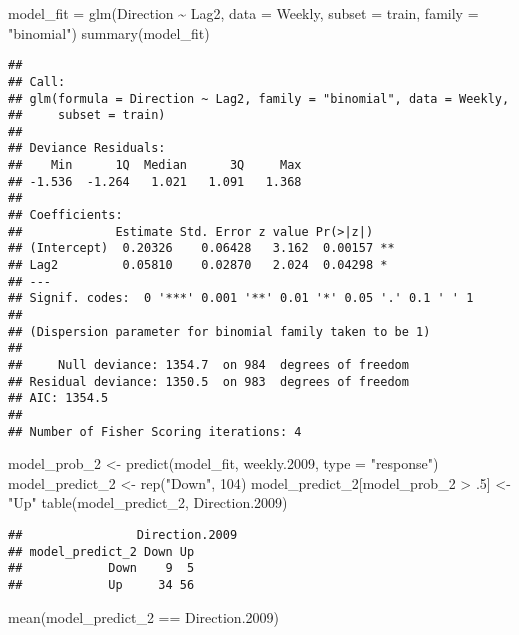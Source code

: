 \documentclass[
]{article}
\newenvironment{Shaded}{\begin{snugshade}}{\end{snugshade}}
\newcommand{\AttributeTok}[1]{\textcolor[rgb]{0.77,0.63,0.00}{#1}}
\newcommand{\DecValTok}[1]{\textcolor[rgb]{0.00,0.00,0.81}{#1}}
\newcommand{\FloatTok}[1]{\textcolor[rgb]{0.00,0.00,0.81}{#1}}
\newcommand{\FunctionTok}[1]{\textcolor[rgb]{0.00,0.00,0.00}{#1}}
\newcommand{\NormalTok}[1]{#1}
\newcommand{\OtherTok}[1]{\textcolor[rgb]{0.56,0.35,0.01}{#1}}
\newcommand{\SpecialCharTok}[1]{\textcolor[rgb]{0.00,0.00,0.00}{#1}}
\newcommand{\StringTok}[1]{\textcolor[rgb]{0.31,0.60,0.02}{#1}}
\begin{document}
\begin{Shaded}
\begin{Highlighting}[]
\NormalTok{model\_fit }\OtherTok{=} \FunctionTok{glm}\NormalTok{(Direction }\SpecialCharTok{\textasciitilde{}}\NormalTok{ Lag2, }\AttributeTok{data =}\NormalTok{ Weekly, }\AttributeTok{subset =}\NormalTok{ train, }\AttributeTok{family =} \StringTok{"binomial"}\NormalTok{)}
\FunctionTok{summary}\NormalTok{(model\_fit)}
\end{Highlighting}
\end{Shaded}

\begin{verbatim}
## 
## Call:
## glm(formula = Direction ~ Lag2, family = "binomial", data = Weekly, 
##     subset = train)
## 
## Deviance Residuals: 
##    Min      1Q  Median      3Q     Max  
## -1.536  -1.264   1.021   1.091   1.368  
## 
## Coefficients:
##             Estimate Std. Error z value Pr(>|z|)   
## (Intercept)  0.20326    0.06428   3.162  0.00157 **
## Lag2         0.05810    0.02870   2.024  0.04298 * 
## ---
## Signif. codes:  0 '***' 0.001 '**' 0.01 '*' 0.05 '.' 0.1 ' ' 1
## 
## (Dispersion parameter for binomial family taken to be 1)
## 
##     Null deviance: 1354.7  on 984  degrees of freedom
## Residual deviance: 1350.5  on 983  degrees of freedom
## AIC: 1354.5
## 
## Number of Fisher Scoring iterations: 4
\end{verbatim}

\begin{Shaded}
\begin{Highlighting}[]
\NormalTok{model\_prob\_2 }\OtherTok{\textless{}{-}} \FunctionTok{predict}\NormalTok{(model\_fit, weekly}\FloatTok{.2009}\NormalTok{, }\AttributeTok{type =} \StringTok{"response"}\NormalTok{)}
\NormalTok{model\_predict\_2 }\OtherTok{\textless{}{-}} \FunctionTok{rep}\NormalTok{(}\StringTok{"Down"}\NormalTok{, }\DecValTok{104}\NormalTok{)}
\NormalTok{model\_predict\_2[model\_prob\_2 }\SpecialCharTok{\textgreater{}}\NormalTok{ .}\DecValTok{5}\NormalTok{] }\OtherTok{\textless{}{-}} \StringTok{"Up"}
\FunctionTok{table}\NormalTok{(model\_predict\_2, Direction}\FloatTok{.2009}\NormalTok{)}
\end{Highlighting}
\end{Shaded}

\begin{verbatim}
##                Direction.2009
## model_predict_2 Down Up
##            Down    9  5
##            Up     34 56
\end{verbatim}

\begin{Shaded}
\begin{Highlighting}[]
\FunctionTok{mean}\NormalTok{(model\_predict\_2 }\SpecialCharTok{==}\NormalTok{ Direction}\FloatTok{.2009}\NormalTok{)}
\end{Highlighting}
\end{Shaded}
\end{document}
